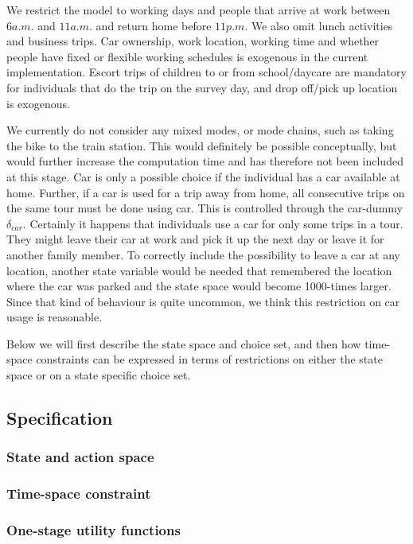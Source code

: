 We restrict the model to working days and people that arrive at work between $6\unit{a.m.}$ and $11\unit{a.m.}$ and return home before $11\unit{p.m}$. We also omit lunch activities and business trips. Car ownership, work location, working time and whether people have fixed or flexible working schedules is exogenous in the current implementation. Escort trips of children to or from school/daycare are mandatory for individuals that do the trip on the survey day, and drop off/pick up location is exogenous. 

We currently do not consider any mixed modes, or mode chains, such as taking the bike to the train station. This would definitely be possible conceptually, but would further increase the computation time and has therefore not been included at this stage. Car is only a possible choice if the individual has a car available at home. Further, if a car is used for a trip away from home, all consecutive trips on the same tour must be done using car. This is controlled through the car-dummy $\delta_{car}$. Certainly it happens that individuals use a car for only some trips in a tour. They might leave their car at work and pick it up the next day or leave it for another family member. To correctly include the possibility to leave a car at any location, another state variable would be needed that remembered the location where the car was parked and the state space would become 1000-times larger. Since that kind of behaviour is quite uncommon, we think this restriction on car usage is reasonable. %

Below we will first describe the state space and choice set, and then how time-space constraints can be expressed in terms of restrictions on either the state space or on a state specific choice set.



\subsection{Specification}
\subsubsection{State and action space}

\subsubsection{Time-space constraint}

\subsubsection{One-stage utility functions}

